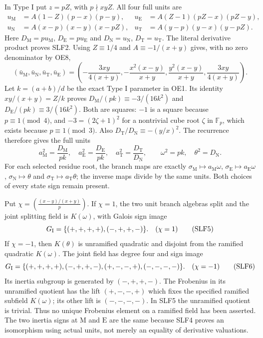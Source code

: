 \documentclass[11pt]{article}
\begin{document}
In Type I put $z=pZ$, with $p\nmid xyZ$. All four full units are
\[
\begin{aligned}
 u_{\mathrm M}&=A(1-Z)(p-x)(p-y),&
 u_{\mathrm E}&=A(Z-1)(pZ-x)(pZ-y),\\
 u_{\mathrm N}&=A(x-p)(x-y)(x-pZ),&
 u_{\mathrm T}&=A(y-p)(y-x)(y-pZ).
\end{aligned}                                                   \tag{SLF2}
\]
Here $D_{\mathrm M}=pu_{\mathrm M}$,
$D_{\mathrm E}=pu_{\mathrm E}$ and
$D_{\mathrm N}=u_{\mathrm N}$, $D_{\mathrm T}=u_{\mathrm T}$.
The literal derivative product proves SLF2. Using $Z\equiv1/4$
and $A\equiv-1/(x+y)$ gives, with no zero denominator by OE8,
\[
 (\bar u_{\mathrm M},\bar u_{\mathrm N},
   \bar u_{\mathrm T},\bar u_{\mathrm E})
 =\left(-\frac{3xy}{4(x+y)},
 -\frac{x^2(x-y)}{x+y},\frac{y^2(x-y)}{x+y},
 \frac{3xy}{4(x+y)}\right).                            \tag{SLF3}
\]
Let $k=(a+b)/d$ be the exact Type I parameter in OE1. Its identity
$xy/(x+y)=Z/k$ proves
$D_{\mathrm M}/(pk)\equiv-3/(16k^2)$ and
$D_{\mathrm E}/(pk)\equiv3/(16k^2)$.
Both are squares: $-1$ is a square because $p\equiv1\pmod4$,
and $-3=(2\zeta+1)^2$ for a nontrivial cube root $\zeta$ in
$\mathbb F_p$, which exists because $p\equiv1\pmod3$.
Also $D_{\mathrm T}/D_{\mathrm N}\equiv-(y/x)^2$.
The recurrence therefore gives the full units
\[
 a_{\mathrm M}^2=\frac{D_{\mathrm M}}{pk},\quad
 a_{\mathrm E}^2=\frac{D_{\mathrm E}}{pk},\quad
 a_{\mathrm T}^2=\frac{D_{\mathrm T}}{D_{\mathrm N}},\qquad
 \omega^2=pk,\quad\theta^2=D_{\mathrm N}.              \tag{SLF4}
\]
For each selected residue root, the branch maps are exactly
$\sigma_{\mathrm M}\mapsto a_{\mathrm M}\omega$,
$\sigma_{\mathrm E}\mapsto a_{\mathrm E}\omega$,
$\sigma_{\mathrm N}\mapsto\theta$ and
$\sigma_{\mathrm T}\mapsto a_{\mathrm T}\theta$;
the inverse maps divide by the same units. Both choices of every
state sign remain present.

Put $\chi=\left(\frac{(x-y)/(x+y)}p\right)$. If $\chi=1$,
the two unit branch algebras split and the joint splitting field
is $K(\omega)$, with Galois sign image
\[
 G_{\rm I}=\{(+,+,+,+),(-,+,+,-)\}.
 \quad (\chi=1)                                       \tag{SLF5}
\]
If $\chi=-1$, then $K(\theta)$ is unramified quadratic and disjoint
from the ramified quadratic $K(\omega)$. The joint field has degree
four and sign image
\[
 G_{\rm I}=\{(+,+,+,+),(-,+,+,-),(+,-,-,+),(-,-,-,-)\}.
 \quad (\chi=-1)                                      \tag{SLF6}
\]
Its inertia subgroup is generated by $(-,+,+,-)$.
The Frobenius in its unramified quotient has the lift $(+,-,-,+)$
which fixes the specified ramified subfield $K(\omega)$; its other
lift is $(-,-,-,-)$. In SLF5 the unramified quotient is trivial.
Thus no unique Frobenius element on a ramified field has been
asserted. The two inertia signs at $\mathrm M$ and $\mathrm E$ are
the same because SLF4 proves an isomorphism using actual units,
not merely an equality of derivative valuations.
\end{document}

